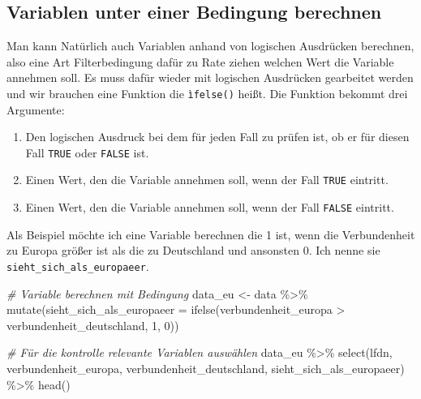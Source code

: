 \documentclass[
]{book}
\newenvironment{Shaded}{\begin{snugshade}}{\end{snugshade}}
\newcommand{\AttributeTok}[1]{\textcolor[rgb]{0.77,0.63,0.00}{#1}}
\newcommand{\CommentTok}[1]{\textcolor[rgb]{0.56,0.35,0.01}{\textit{#1}}}
\newcommand{\DecValTok}[1]{\textcolor[rgb]{0.00,0.00,0.81}{#1}}
\newcommand{\FunctionTok}[1]{\textcolor[rgb]{0.00,0.00,0.00}{#1}}
\newcommand{\NormalTok}[1]{#1}
\newcommand{\OtherTok}[1]{\textcolor[rgb]{0.56,0.35,0.01}{#1}}
\newcommand{\SpecialCharTok}[1]{\textcolor[rgb]{0.00,0.00,0.00}{#1}}
\begin{document}
\hypertarget{variablen-unter-einer-bedingung-berechnen}{%
\subsection{Variablen unter einer Bedingung berechnen}\label{variablen-unter-einer-bedingung-berechnen}}

Man kann Natürlich auch Variablen anhand von logischen Ausdrücken berechnen, also eine Art Filterbedingung dafür zu Rate ziehen welchen Wert die Variable annehmen soll. Es muss dafür wieder mit logischen Ausdrücken gearbeitet werden und wir brauchen eine Funktion die \texttt{ìfelse()} heißt. Die Funktion bekommt drei Argumente:

\begin{enumerate}
\def\labelenumi{\arabic{enumi}.}
\item
  Den logischen Ausdruck bei dem für jeden Fall zu prüfen ist, ob er für diesen Fall \texttt{TRUE} oder \texttt{FALSE} ist.
\item
  Einen Wert, den die Variable annehmen soll, wenn der Fall \texttt{TRUE} eintritt.
\item
  Einen Wert, den die Variable annehmen soll, wenn der Fall \texttt{FALSE} eintritt.
\end{enumerate}

Als Beispiel möchte ich eine Variable berechnen die 1 ist, wenn die Verbundenheit zu Europa größer ist als die zu Deutschland und ansonsten 0. Ich nenne sie \texttt{sieht\_sich\_als\_europaeer}.

\begin{Shaded}
\begin{Highlighting}[]
\CommentTok{\# Variable berechnen mit Bedingung}
\NormalTok{data\_eu }\OtherTok{\textless{}{-}}\NormalTok{ data }\SpecialCharTok{\%\textgreater{}\%} 
  \FunctionTok{mutate}\NormalTok{(}\AttributeTok{sieht\_sich\_als\_europaeer =} \FunctionTok{ifelse}\NormalTok{(verbundenheit\_europa }\SpecialCharTok{\textgreater{}}\NormalTok{ verbundenheit\_deutschland, }\DecValTok{1}\NormalTok{, }\DecValTok{0}\NormalTok{)) }

\CommentTok{\# Für die kontrolle relevante Variablen auswählen}
\NormalTok{data\_eu }\SpecialCharTok{\%\textgreater{}\%} 
  \FunctionTok{select}\NormalTok{(lfdn, verbundenheit\_europa, verbundenheit\_deutschland, sieht\_sich\_als\_europaeer) }\SpecialCharTok{\%\textgreater{}\%}   \FunctionTok{head}\NormalTok{()}
\end{Highlighting}
\end{Shaded}
\end{document}
